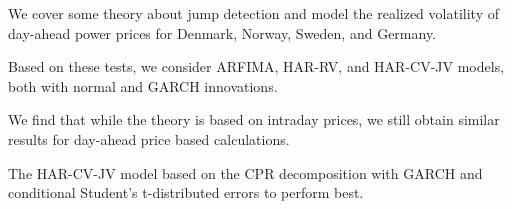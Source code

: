 We cover some theory about jump detection and model the realized volatility of day-ahead power prices for Denmark, Norway, Sweden, and Germany.

Based on these tests, we consider ARFIMA, HAR-RV, and HAR-CV-JV models, both with normal and GARCH innovations.

We find that while the theory is based on intraday prices, we still obtain similar results for day-ahead price based calculations.

The HAR-CV-JV model based on the CPR decomposition with GARCH and conditional Student's t-distributed errors to perform best.
